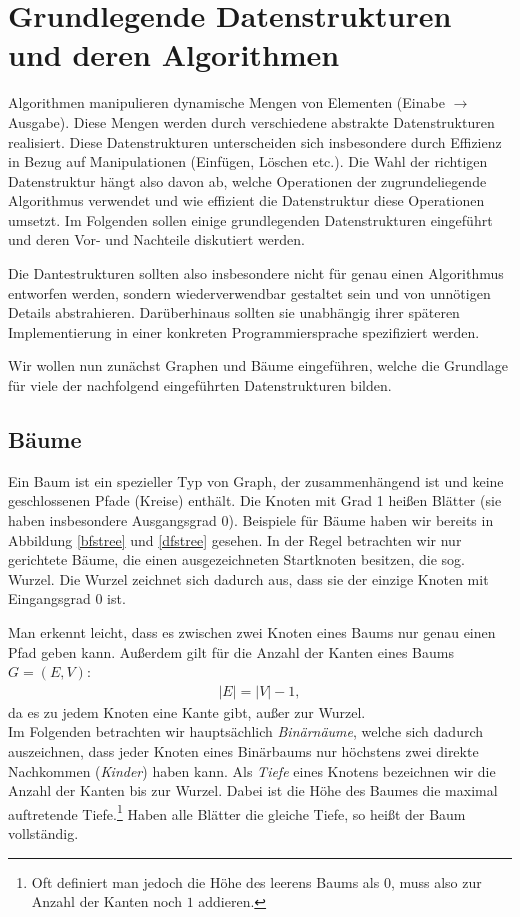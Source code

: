 \section{Grundlegende Datenstrukturen und deren Algorithmen}
Algorithmen manipulieren dynamische Mengen von Elementen (Einabe
$\rightarrow$ Ausgabe). Diese Mengen werden durch verschiedene
abstrakte Datenstrukturen realisiert. Diese Datenstrukturen
unterscheiden sich insbesondere durch Effizienz in Bezug auf
Manipulationen (Einfügen, Löschen etc.). Die Wahl der richtigen
Datenstruktur hängt also davon ab, welche Operationen der
zugrundeliegende Algorithmus verwendet und wie effizient die
Datenstruktur diese Operationen umsetzt. Im Folgenden sollen einige
grundlegenden Datenstrukturen eingeführt und deren Vor- und Nachteile
diskutiert werden.

Die Dantestrukturen sollten also insbesondere nicht für genau einen
Algorithmus entworfen werden, sondern wiederverwendbar gestaltet sein
und von unnötigen Details abstrahieren. Darüberhinaus sollten sie
unabhängig ihrer späteren Implementierung in einer konkreten
Programmiersprache spezifiziert werden.

Wir wollen nun zunächst Graphen und Bäume eingeführen, welche die
Grundlage für viele der nachfolgend eingeführten Datenstrukturen
bilden.



\subsection{Bäume}
Ein Baum ist ein spezieller Typ von Graph, der zusammenhängend ist und
keine geschlossenen Pfade (Kreise) enthält. Die Knoten mit Grad 1
heißen Blätter (sie haben insbesondere Ausgangsgrad 0). Beispiele für
Bäume haben wir bereits in Abbildung \ref{bfstree} und \ref{dfstree}
gesehen. In der Regel betrachten wir nur gerichtete Bäume, die einen
ausgezeichneten Startknoten besitzen, die sog. Wurzel. Die Wurzel
zeichnet sich dadurch aus, dass sie der einzige Knoten mit
Eingangsgrad 0 ist.

Man erkennt leicht, dass es zwischen zwei Knoten eines Baums nur genau
einen Pfad geben kann. Außerdem gilt für die Anzahl der Kanten eines
Baums $G = (E,V)$:
\begin{gather*}
  |E| = |V| - 1,
\end{gather*}
da es zu jedem Knoten eine Kante gibt, außer zur Wurzel.\\

Im Folgenden betrachten wir hauptsächlich \emph{Binärnäume}, welche
sich dadurch auszeichnen, dass jeder Knoten eines Binärbaums nur
höchstens zwei direkte Nachkommen (\emph{Kinder}) haben kann.  Als
\emph{Tiefe} eines Knotens bezeichnen wir die Anzahl der Kanten bis
zur Wurzel. Dabei ist die Höhe des Baumes die maximal auftretende
Tiefe.\footnote{Oft definiert man jedoch die Höhe des leerens Baums
  als $0$, muss also zur Anzahl der Kanten noch $1$ addieren.} Haben
alle Blätter die gleiche Tiefe, so heißt der Baum vollständig.

